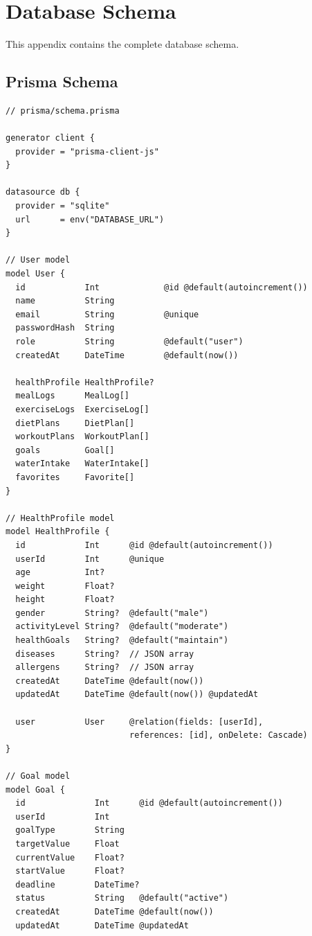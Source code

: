 \chapter{Database Schema}

This appendix contains the complete database schema.

\section{Prisma Schema}

\begin{lstlisting}[caption=Complete Prisma Schema]
// prisma/schema.prisma

generator client {
  provider = "prisma-client-js"
}

datasource db {
  provider = "sqlite"
  url      = env("DATABASE_URL")
}

// User model
model User {
  id            Int             @id @default(autoincrement())
  name          String
  email         String          @unique
  passwordHash  String
  role          String          @default("user")
  createdAt     DateTime        @default(now())
  
  healthProfile HealthProfile?
  mealLogs      MealLog[]
  exerciseLogs  ExerciseLog[]
  dietPlans     DietPlan[]
  workoutPlans  WorkoutPlan[]
  goals         Goal[]
  waterIntake   WaterIntake[]
  favorites     Favorite[]
}

// HealthProfile model
model HealthProfile {
  id            Int      @id @default(autoincrement())
  userId        Int      @unique
  age           Int?
  weight        Float?
  height        Float?
  gender        String?  @default("male")
  activityLevel String?  @default("moderate")
  healthGoals   String?  @default("maintain")
  diseases      String?  // JSON array
  allergens     String?  // JSON array
  createdAt     DateTime @default(now())
  updatedAt     DateTime @default(now()) @updatedAt
  
  user          User     @relation(fields: [userId], 
                         references: [id], onDelete: Cascade)
}

// Goal model
model Goal {
  id              Int      @id @default(autoincrement())
  userId          Int
  goalType        String
  targetValue     Float
  currentValue    Float?
  startValue      Float?
  deadline        DateTime?
  status          String   @default("active")
  createdAt       DateTime @default(now())
  updatedAt       DateTime @updatedAt
  

\end{lstlisting}
